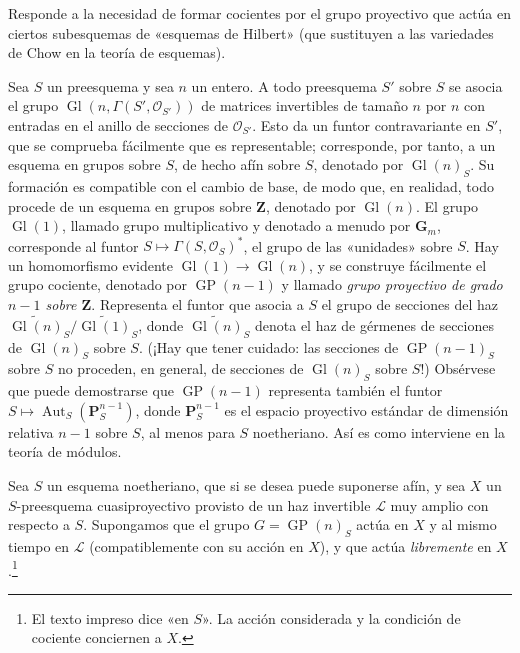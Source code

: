 
Responde a la necesidad de formar cocientes por el grupo proyectivo que actúa
en ciertos subesquemas de «esquemas de Hilbert» (que sustituyen a las
variedades de Chow en la teoría de esquemas).

Sea $S$ un preesquema y sea $n$ un entero. A todo preesquema $S'$ sobre $S$
se asocia el grupo $\operatorname{Gl}(n,\Gamma(S',\mathcal O_{S'}))$ de
matrices invertibles de tamaño $n$ por $n$ con entradas en el anillo de
secciones de $\mathcal O_{S'}$. Esto da un funtor contravariante en $S'$, que
se comprueba fácilmente que es representable; corresponde, por tanto, a un
esquema en grupos sobre $S$, de hecho afín sobre $S$, denotado por
$\operatorname{Gl}(n)_S$. Su formación es compatible con el cambio de base,
de modo que, en realidad, todo procede de un esquema en grupos sobre
$\mathbf Z$, denotado por $\operatorname{Gl}(n)$. El grupo
$\operatorname{Gl}(1)$, llamado grupo multiplicativo y denotado a menudo por
$\mathbf G_m$, corresponde al funtor
$S\longmapsto\Gamma(S,\mathcal O_S)^*$, el grupo de las «unidades» sobre $S$.
Hay un homomorfismo evidente
$\operatorname{Gl}(1)\to\operatorname{Gl}(n)$, y se construye fácilmente el
grupo cociente, denotado por $\operatorname{GP}(n-1)$ y llamado \emph{grupo
proyectivo de grado $n-1$ sobre $\mathbf Z$}. Representa el funtor que asocia
a $S$ el grupo de secciones del haz
$\widetilde{\operatorname{Gl}(n)}_S/
\widetilde{\operatorname{Gl}(1)}_S$, donde
$\widetilde{\operatorname{Gl}(n)}_S$ denota el haz de gérmenes de secciones de
$\operatorname{Gl}(n)_S$ sobre $S$. (¡Hay que tener cuidado: las secciones de
$\operatorname{GP}(n-1)_S$ sobre $S$ no proceden, en general, de secciones de
$\operatorname{Gl}(n)_S$ sobre $S$!) Obsérvese que puede demostrarse que
$\operatorname{GP}(n-1)$ representa también el funtor
$S\longmapsto\operatorname{Aut}_S(\mathbf P_S^{n-1})$, donde
$\mathbf P_S^{n-1}$ es el espacio proyectivo estándar de dimensión relativa
$n-1$ sobre $S$, al menos para $S$ noetheriano. Así es como interviene en la
teoría de módulos.

Sea $S$ un esquema noetheriano, que si se desea puede suponerse afín, y sea
$X$ un $S$-preesquema cuasiproyectivo provisto de un haz invertible
$\mathcal L$ muy amplio con respecto a $S$. Supongamos que el grupo
$G=\operatorname{GP}(n)_S$ actúa en $X$ y al mismo tiempo en $\mathcal L$
(compatiblemente con su acción en $X$), y que actúa \emph{libremente} en
$X$.\footnote{El texto impreso dice «en $S$». La acción considerada y la
condición de cociente conciernen a $X$.}

